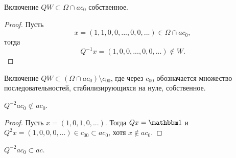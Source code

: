 \begin{lemma}
	Включение $QW\subset \Omega\cap ac_0$ собственное.
\end{lemma}

\begin{proof}
	Пусть
	\begin{equation}
		x = (1,1,0,0,...,0,0,...) \in \Omega\cap ac_0,
	\end{equation}
	тогда
	\begin{equation}
		Q^{-1}x = (1,0,0,...,0,0,...) \notin W
		.
	\end{equation}
\end{proof}

\begin{hypothesis}
	Включение $QW\subset (\Omega\cap ac_0) \setminus c_{00}$, где через $c_{00}$ обозначается множество последовательностей,
	стабилизирующихся на нуле, собственное.
\end{hypothesis}

\begin{lemma}
	$Q^{-2} ac_0 \not \subset ac_0$.
\end{lemma}

\begin{proof}
	Пусть $x=(1,0,1,0,...)$.
	Тогда $Qx = \one$ и $Q^2 x = (1,0,0,0,...) \in c_{00} \subset ac_0$,
	хотя $x\notin ac_0$.
\end{proof}

\begin{hypothesis}
	$Q^{-2} ac_0 \subset ac$.
\end{hypothesis}
